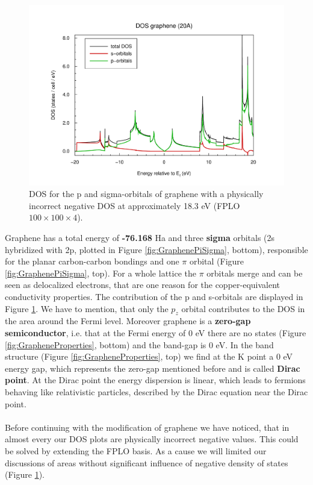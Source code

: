 				\begin{figure}
					\includegraphics[width=\textwidth]{Results/Graphene/Graphene20A/graphene20AdosPiSigma.pdf}
					\caption{DOS for the p and sigma-orbitals of graphene with a physically incorrect negative DOS at approximately 18.3 eV (FPLO $100\times100\times4$).}
					\label{fig:GraphenePiSigmaDos}
				\end{figure}				
				Graphene has a total energy of \textbf{-76.168} Ha and three \textbf{sigma} orbitals (2s hybridized with 2p, plotted in Figure \ref{fig:GraphenePiSigma}, bottom), responsible for the planar carbon-carbon bondings and one \textbf{$\pi$} orbital (Figure \ref{fig:GraphenePiSigma}, top). For a whole lattice the $\pi$ orbitals merge and can be seen as delocalized electrons, that are one reason for the copper-equivalent conductivity properties. The contribution of the p and s-orbitals are displayed in Figure \ref{fig:GraphenePiSigmaDos}. We have to mention, that only the $p_z$ orbital contributes to the DOS in the area around the Fermi level. Moreover graphene is a \textbf{zero-gap semiconductor}, i.e. that at the Fermi energy of 0 eV there are no states (Figure \ref{fig:GrapheneProperties}, bottom) and the band-gap is 0 eV. In the band structure (Figure \ref{fig:GrapheneProperties}, top) we find at the K point a 0 eV energy gap, which represents the zero-gap mentioned before and is called \textbf{Dirac point}. At the Dirac point the energy dispersion is linear, which leads to fermions behaving like relativistic particles, described by the Dirac equation near the Dirac point. \\\\
				Before continuing with the modification of graphene we have noticed, that in almost every our DOS plots are physically incorrect negative values. This could be solved by extending the FPLO basis. As a cause we will limited our discussions of areas without significant influence of negative density  of states (Figure \ref{fig:GraphenePiSigmaDos}).
	
